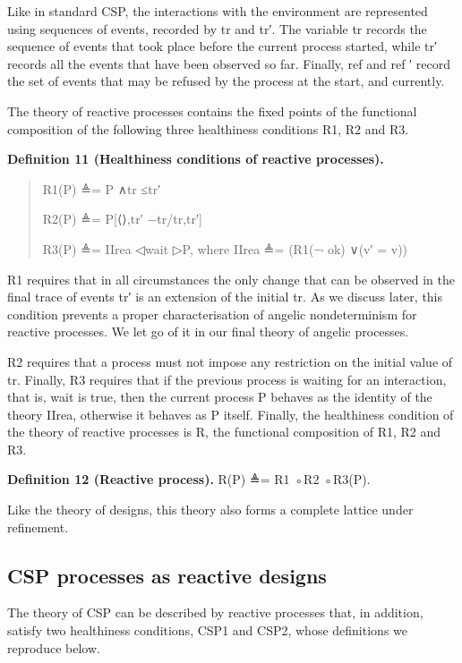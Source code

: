 \documentclass[11pt]{article}
\begin{document}
Like in standard CSP, the interactions with the environment are represented using sequences of events, recorded by tr and tr′. The variable tr records the sequence of events that took place before the current process started, while tr′ records all the events that have been observed so far. Finally, ref and ref ′ record the set of events that may be refused by the process at the start, and currently.

The theory of reactive processes contains the fixed points of the functional composition of the following three healthiness conditions R1, R2 and R3.

\noindent\textbf{Definition 11 (Healthiness conditions of reactive processes).}


\begin{quote}\small\raggedright
R1(P) ≜= P ∧tr ≤tr′
\par
R2(P) ≜= P[⟨⟩,tr′ −tr/tr,tr′]
\par
R3(P) ≜= IIrea ◁wait ▷P, where IIrea ≜= (R1(¬ ok) ∨(v′ = v))
\end{quote}

R1 requires that in all circumstances the only change that can be observed in the final trace of events tr′ is an extension of the initial tr. As we discuss later, this condition prevents a proper characterisation of angelic nondeterminism for reactive processes. We let go of it in our final theory of angelic processes.

R2 requires that a process must not impose any restriction on the initial value of tr. Finally, R3 requires that if the previous process is waiting for an interaction, that is, wait is true, then the current process P behaves as the identity of the theory IIrea, otherwise it behaves as P itself. Finally, the healthiness condition of the theory of reactive processes is R, the functional composition of R1, R2 and R3.

\noindent\textbf{Definition 12 (Reactive process).} R(P) ≜= R1 ◦R2 ◦R3(P).


Like the theory of designs, this theory also forms a complete lattice under refinement.

\subsection{CSP processes as reactive designs}
The theory of CSP can be described by reactive processes that, in addition, satisfy two healthiness conditions, CSP1 and CSP2, whose definitions we reproduce below.
\end{document}
